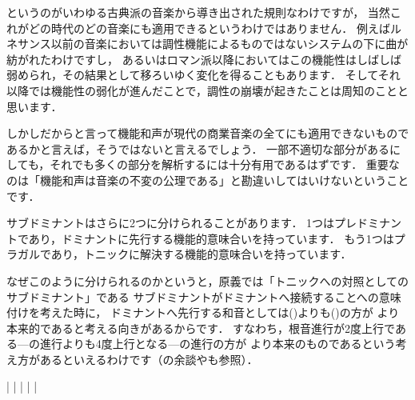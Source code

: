 \documentclass[dvipdfmx,uplatex,b5paper,openany,jbase=12Q,nomag*,textwidth-limit=44%
               ]{gachimuchi}
\begin{document}
\begin{Yodan}
というのがいわゆる古典派の音楽から導き出された規則なわけですが，
当然これがどの時代のどの音楽にも適用できるというわけではありません．
例えばルネサンス以前の音楽においては調性機能によるものではないシステムの下に曲が紡がれたわけですし，
あるいはロマン派以降においてはこの機能性はしばしば弱められ，その結果として移ろいゆく変化を得ることもあります．
そしてそれ以降では機能性の弱化が進んだことで，調性の崩壊が起きたことは周知のことと思います．

しかしだからと言って機能和声が現代の商業音楽の全てにも適用できないものであるかと言えば，そうではないと言えるでしょう．
一部不適切な部分があるにしても，それでも多くの部分を解析するには十分有用であるはずです．
重要なのは「機能和声は音楽の不変の公理である」と勘違いしてはいけないということです．
\end{Yodan}
\begin{Yodan}
サブドミナントはさらに2つに分けられることがあります．
1つはプレドミナントであり，ドミナントに先行する機能的意味合いを持っています．
もう1つはプラガルであり，トニックに解決する機能的意味合いを持っています．

なぜこのように分けられるのかというと，原義では「トニックへの対照としてのサブドミナント」である
サブドミナントがドミナントへ接続することへの意味付けを考えた時に，
ドミナントへ先行する和音としては\Gniv(\Gniv\Min)よりも\Gnii\Min(\Gnii\Dimt)の方が
より本来的であると考える向きがあるからです．
すなわち，根音進行が2度上行である\Gniv---\Gnv の進行よりも4度上行となる\Gnii\Min---\Gnv の進行の方が
より本来のものであるという考え方があるといえるわけです（の余談やも参照）．
\begin{Music}
  \Startpiece
  \znotes|\en
  \NOTes%
  |%
  \en\doublebar%
  \NOTes%
  |%
  \en\doublebar%
  \znotes|\en
  \NOTes%
  |%
  \en\setdoublebar%
  \endpiece
\end{Music}
\end{Yodan}
\end{document}
